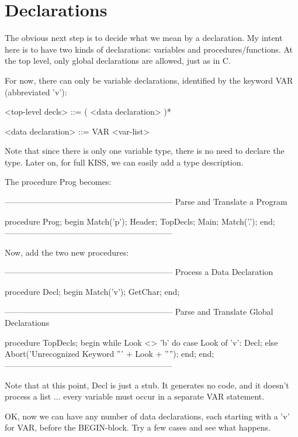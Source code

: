 \documentclass[float=false, crop=false]{standalone}
\begin{document}
\section{Declarations}

The obvious next step is to decide what we mean by a declaration. My intent here
is to have two kinds of declarations: variables and procedures/functions. At the
top level, only global declarations are allowed, just as in C.

For now, there can only be variable declarations, identified by the keyword VAR
(abbreviated 'v'):


     <top-level decls> ::= ( <data declaration> )*

     <data declaration> ::= VAR <var-list>


Note that since there is only one variable type, there is no need to declare the
type. Later on, for full KISS, we can easily add a type description.

The procedure Prog becomes:

\begin{code}
{--------------------------------------------------------------}
{  Parse and Translate a Program }

procedure Prog;
begin
   Match('p');
   Header;
   TopDecls;
   Main;
   Match('.');
end;
{--------------------------------------------------------------}
\end{code}

Now, add the two new procedures:

\begin{code}
{--------------------------------------------------------------}
{ Process a Data Declaration }

procedure Decl;
begin
   Match('v');
   GetChar;
end;


{--------------------------------------------------------------}
{ Parse and Translate Global Declarations }

procedure TopDecls;
begin
   while Look <> 'b' do
      case Look of
        'v': Decl;
      else Abort('Unrecognized Keyword ''' + Look + '''');
      end;
end;
{--------------------------------------------------------------}
\end{code}

Note that at this point, Decl is just a stub. It generates no code, and it
doesn't process a list ... every variable must occur in a separate VAR
statement.

OK, now we can have any number of data declarations, each starting with a 'v'
for VAR, before the BEGIN-block. Try a few cases and see what happens.
\end{document}
